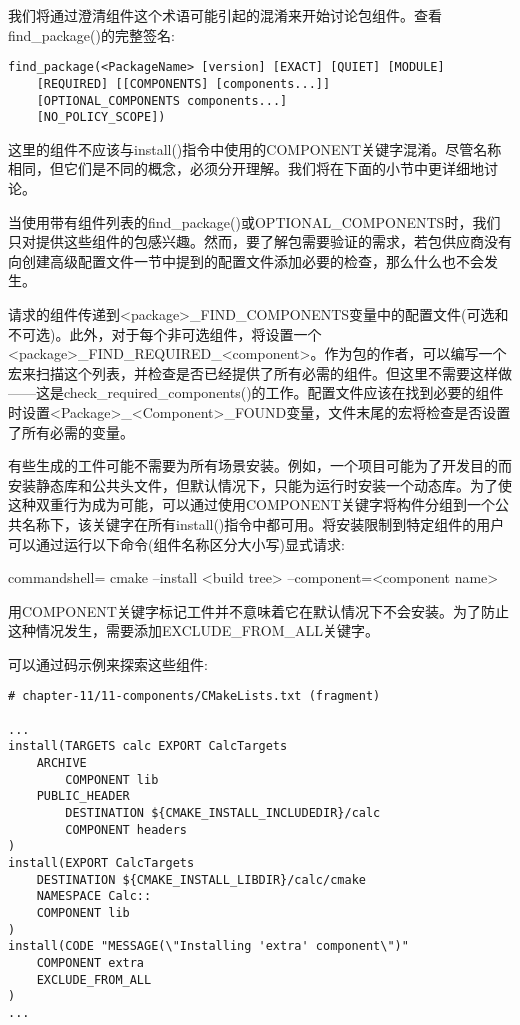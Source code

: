 
我们将通过澄清组件这个术语可能引起的混淆来开始讨论包组件。查看find\_package()的完整签名:

\begin{lstlisting}[style=styleCMake]
find_package(<PackageName> [version] [EXACT] [QUIET] [MODULE]
	[REQUIRED] [[COMPONENTS] [components...]]
	[OPTIONAL_COMPONENTS components...]
	[NO_POLICY_SCOPE])
\end{lstlisting}

这里的组件不应该与install()指令中使用的COMPONENT关键字混淆。尽管名称相同，但它们是不同的概念，必须分开理解。我们将在下面的小节中更详细地讨论。


当使用带有组件列表的find\_package()或OPTIONAL\_COMPONENTS时，我们只对提供这些组件的包感兴趣。然而，要了解包需要验证的需求，若包供应商没有向创建高级配置文件一节中提到的配置文件添加必要的检查，那么什么也不会发生。

请求的组件传递到<package>\_FIND\_COMPONENTS变量中的配置文件(可选和不可选)。此外，对于每个非可选组件，将设置一个<package>\_FIND\_REQUIRED\_<component>。作为包的作者，可以编写一个宏来扫描这个列表，并检查是否已经提供了所有必需的组件。但这里不需要这样做——这是check\_required\_components()的工作。配置文件应该在找到必要的组件时设置<Package>\_<Component>\_FOUND变量，文件末尾的宏将检查是否设置了所有必需的变量。


有些生成的工件可能不需要为所有场景安装。例如，一个项目可能为了开发目的而安装静态库和公共头文件，但默认情况下，只能为运行时安装一个动态库。为了使这种双重行为成为可能，可以通过使用COMPONENT关键字将构件分组到一个公共名称下，该关键字在所有install()指令中都可用。将安装限制到特定组件的用户可以通过运行以下命令(组件名称区分大小写)显式请求:

\begin{tcblisting}{commandshell={}}
cmake --install <build tree> --component=<component name>
\end{tcblisting}

用COMPONENT关键字标记工件并不意味着它在默认情况下不会安装。为了防止这种情况发生，需要添加EXCLUDE\_FROM\_ALL关键字。

可以通过码示例来探索这些组件:

\begin{lstlisting}[style=styleCMake]
# chapter-11/11-components/CMakeLists.txt (fragment)

...
install(TARGETS calc EXPORT CalcTargets
	ARCHIVE
		COMPONENT lib
	PUBLIC_HEADER
		DESTINATION ${CMAKE_INSTALL_INCLUDEDIR}/calc
		COMPONENT headers
)
install(EXPORT CalcTargets
	DESTINATION ${CMAKE_INSTALL_LIBDIR}/calc/cmake
	NAMESPACE Calc::
	COMPONENT lib
)
install(CODE "MESSAGE(\"Installing 'extra' component\")"
	COMPONENT extra
	EXCLUDE_FROM_ALL
)
...
\end{lstlisting}

